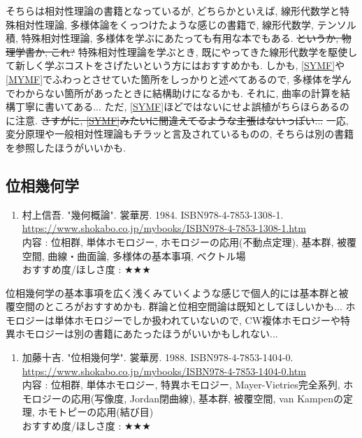 \documentclass[10pt,a4paper]{jsarticle}
\begin{document}
    そちらは相対性理論の書籍となっているが, どちらかといえば, 線形代数学と特殊相対性理論, 多様体論をくっつけたような感じの書籍で, 線形代数学, テンソル積, 特殊相対性理論, 多様体を学ぶにあたっても有用な本でもある. \sout{というか, 物理学書か, これ? }特殊相対性理論を学ぶとき, 既にやってきた線形代数学を駆使して新しく学ぶコストをさげたいという方にはおすすめかも. しかも, \ref{SYMF}や\ref{MYMF}でふわっとさせていた箇所をしっかりと述べてあるので, 多様体を学んでわからない箇所があったときに結構助けになるかも. それに, 曲率の計算を結構丁寧に書いてある... ただ, \ref{SYMF}ほどではないにせよ誤植がちらほらあるのに注意. \sout{さすがに, \ref{SYMF}みたいに間違えてるような主張はないっぽい...} 一応, 変分原理や一般相対性理論もチラッと言及されているものの, そちらは別の書籍を参照したほうがいいかも. 
\subsection{位相幾何学}
    \begin{enumerate}
        \renewcommand{\theenumi}{[TG\arabic{enumi}]}
        \renewcommand{\labelenumi}{\theenumi}
        \setcounter{enumi}{0}
        \item \label{MSTG} 村上信吾. "幾何概論". 裳華房. 1984. ISBN978-4-7853-1308-1. \\
        \url{https://www.shokabo.co.jp/mybooks/ISBN978-4-7853-1308-1.htm} \\
        内容 : 位相群, 単体ホモロジー, ホモロジーの応用(不動点定理), 基本群, 被覆空間, 曲線・曲面論, 多様体の基本事項, ベクトル場\\
        おすすめ度/ほしさ度 : $\bigstar \bigstar \bigstar $
    \end{enumerate}\par  
    位相幾何学の基本事項を広く浅くみていくような感じで個人的には基本群と被覆空間のところがおすすめかも. 群論と位相空間論は既知としてほしいかも... ホモロジーは単体ホモロジーでしか扱われていないので, CW複体ホモロジーや特異ホモロジーは別の書籍にあたったほうがいいかもしれない... 
    \begin{enumerate}
        \renewcommand{\theenumi}{[TG\arabic{enumi}]}
        \renewcommand{\labelenumi}{\theenumi}
        \setcounter{enumi}{1}
        \item \label{KJTG} 加藤十吉. "位相幾何学". 裳華房. 1988. ISBN978-4-7853-1404-0. \\
        \url{https://www.shokabo.co.jp/mybooks/ISBN978-4-7853-1404-0.htm} \\
        内容 : 位相群, 単体ホモロジー, 特異ホモロジー, Mayer-Vietries完全系列, ホモロジーの応用(写像度, Jordan閉曲線), 基本群, 被覆空間, van Kampenの定理, ホモトピーの応用(結び目)\\
        おすすめ度/ほしさ度 : $\bigstar \bigstar \bigstar $
    \end{enumerate}\par 
\end{document}
